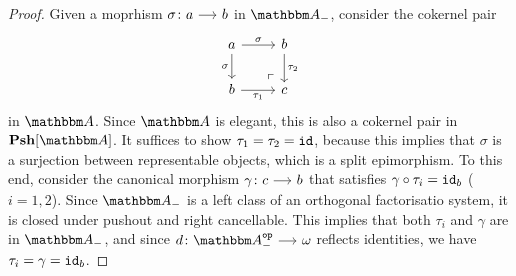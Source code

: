 \documentclass[a4paper,dvipsnames,11pt,backend=luatex]{amsart} %
\begin{document}
\begin{proof}
	Given a moprhism $\sigma\colon a\arr b$ in $\dgm{A}_-$,
	consider the cokernel pair
	\[
		\begin{tikzcd}
			a
			\ar[r,"\sigma"]
			\ar[d,"\sigma"']
				&
				b
				\ar[d,"\tau_2"]
			\\
			b
			\ar[r,"\tau_1"']
				&
				c
				\ar[ul,"\ulcorner"{very near start},phantom]
		\end{tikzcd}
	\]
	in $\dgm{A}$. Since $\dgm{A}$ is elegant, this is also a cokernel pair in $\Psh[\dgm{A}]$.
	It suffices to show $\tau_1=\tau_2=\mathtt{id}$, because this implies that $\sigma$ is a surjection between representable objects, which is a split epimorphism.
	To this end, consider the canonical morphism $\gamma\colon c \arr b$ that satisfies $\gamma\circ\tau_i=\mathtt{id}_b$ ($i=1,2$).
	Since $\dgm{A}_-$ is a left class of an orthogonal factorisatio system, it is closed under pushout and right cancellable.
	This implies that both $\tau_i$ and $\gamma$ are in $\dgm{A}_-$, and since $d\colon\dgm{A}_-^\op\arr\omega$ reflects identities,
	we have $\tau_i=\gamma=\mathtt{id}_b$.
\end{proof}
\end{document}
